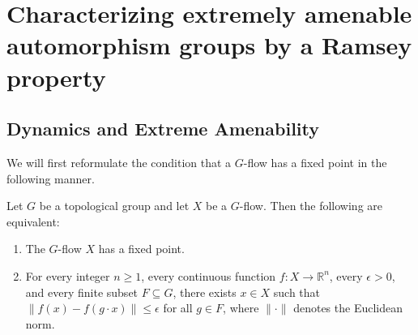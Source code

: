 
\chapter{Characterizing extremely amenable automorphism groups by a Ramsey property}


\section{Dynamics and Extreme Amenability}
\label{sec:dynamics_extreme_amenability}

We will first reformulate the condition that a $G$-flow has a fixed point
in the following manner.


\begin{lemma}
    \label{lem:fixed_point_equiv}
    Let $G$ be a topological group and let $X$ be a $G$-flow. Then the following are equivalent:
    \begin{enumerate}
        \item[(i)] The $G$-flow $X$ has a fixed point.
        \item[(ii)] For every integer $n \ge 1$, every continuous function $f: X \to \mathbb{R}^n$, every $\epsilon > 0$, and every finite subset $F \subseteq G$, there exists $x \in X$ such that $\|f(x) - f(g \cdot x)\| \le \epsilon$ for all $g \in F$, where $\|\cdot\|$ denotes the Euclidean norm.
    \end{enumerate}
\end{lemma}

